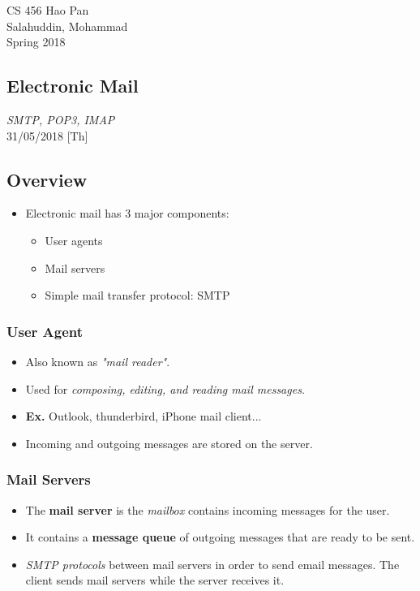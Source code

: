 \documentclass{article}
\begin{document}
\noindent
{CS 456 \hfill Hao Pan}\\
{Salahuddin, Mohammad}\\
{Spring 2018}


\begin{center}
\section{Electronic Mail}
\vspace{-4mm}
{\it SMTP, POP3, IMAP}\\
\noindent
{\hfill 31/05/2018 [Th]}
\end{center}

\subsection{Overview}

\begin{itemize}
\item Electronic mail has 3 major components:
\begin{itemize}
\item User agents
\item Mail servers
\item Simple mail transfer protocol: SMTP
\end{itemize}
\end{itemize}

\subsubsection{User Agent}

\begin{itemize}
\item Also known as {\it "mail reader"}.
\item Used for {\it composing, editing, and reading mail messages}.
\item {\bf Ex.} Outlook, thunderbird, iPhone mail client...
\item Incoming and outgoing messages are stored on the server.
\end{itemize}

\subsubsection{Mail Servers}

\begin{itemize}
\item The {\bf mail server} is the {\it mailbox} contains incoming messages for the user.
\item It contains a {\bf message queue} of outgoing messages that are ready to be sent.
\item {\it SMTP protocols} between mail servers in order to send email messages. The client sends mail servers while the server receives it.
\end{itemize}
\end{document}
